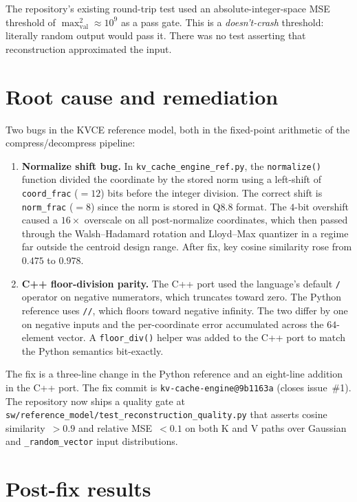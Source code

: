 \documentclass[11pt]{article}
\begin{document}
The repository's existing round-trip test used an absolute-integer-space
MSE threshold of $\max_{\mathrm{val}}^2 \approx 10^9$ as a pass gate.
This is a \emph{doesn't-crash} threshold: literally random output
would pass it. There was no test asserting that reconstruction
approximated the input.

\section{Root cause and remediation}
\label{sec:rootcause}

Two bugs in the KVCE reference model, both in the fixed-point
arithmetic of the compress/decompress pipeline:

\begin{enumerate}
\item \textbf{Normalize shift bug.} In \texttt{kv\_cache\_engine\_ref.py},
the \texttt{normalize()} function divided the coordinate by the stored
norm using a left-shift of \texttt{coord\_frac} ($=12$) bits before
the integer division. The correct shift is \texttt{norm\_frac} ($=8$)
since the norm is stored in Q8.8 format. The $4$-bit overshift caused
a $16\times$ overscale on all post-normalize coordinates, which then
passed through the Walsh--Hadamard rotation and Lloyd--Max quantizer
in a regime far outside the centroid design range. After fix, key
cosine similarity rose from $0.475$ to $0.978$.

\item \textbf{C++ floor-division parity.} The C++ port used the
language's default \texttt{/} operator on negative numerators, which
truncates toward zero. The Python reference uses \texttt{//}, which
floors toward negative infinity. The two differ by one on negative
inputs and the per-coordinate error accumulated across the $64$-element
vector. A \texttt{floor\_div()} helper was added to the C++ port to
match the Python semantics bit-exactly.
\end{enumerate}

The fix is a three-line change in the Python reference and an
eight-line addition in the C++ port. The fix commit is
\texttt{kv-cache-engine@9b1163a} (closes
issue~\#1). The repository now ships a quality gate at
\texttt{sw/reference\_model/test\_reconstruction\_quality.py}
that asserts cosine similarity~$> 0.9$ and relative MSE~$< 0.1$ on
both K and V paths over Gaussian and \texttt{\_random\_vector}
input distributions.

\section{Post-fix results}
\label{sec:postfix}
\end{document}
